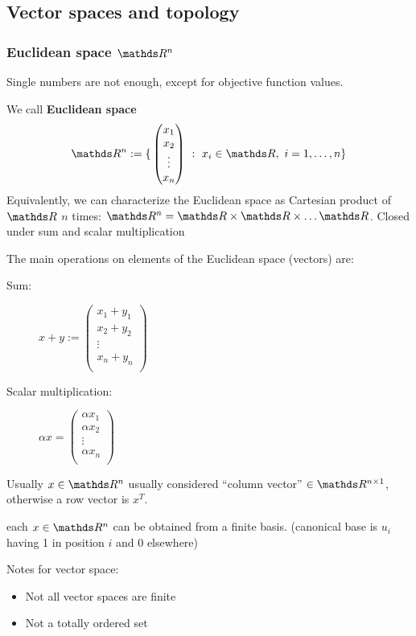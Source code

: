 \documentclass[computationalMathematics.tex]{subfiles}
\begin{document}
\subsection{Vector spaces and topology}
\subsubsection{Euclidean space $\R^n$}
Single numbers are not enough, except for objective function values.
\begin{definition}
We call \textbf{Euclidean space}
\[
  \R^n := \{ \, \begin{pmatrix}x_1\\ x_2\\ \vdots\\ x_n\end{pmatrix}~:~x_i \in \R,~i = 1, \ldots, n\}
\]
Equivalently, we can characterize the Euclidean space as Cartesian product of $\R$ $n$ times: $\R^n = \R \times \R \times \ldots \R$. Closed under sum and scalar multiplication
\end{definition}

The main operations on elements of the Euclidean space (vectors) are:

\begin{description}
  \item[{\sc Sum:}] $x + y := \begin{pmatrix}x_1 + y_1\\
      x_2 + y_2\\
      \vdots\\
      x_n + y_n\\
  \end{pmatrix}$
\item[{\sc Scalar multiplication:}] $\alpha x = \begin{pmatrix}\alpha x_1\\
    \alpha x_2\\
    \vdots\\
    \alpha x_n\\
  \end{pmatrix}$
\end{description}

Usually $x \in \R^n$ usually considered “column vector” $\in \R^{n \times 1}$, otherwise a row vector is  $x^T$.

\begin{definition} each $x \in \R^n$ can be obtained from a finite basis. (canonical base is $u_i$ having 1 in position $i$ and 0 elsewhere)
\end{definition}
Notes for vector space:
\begin{itemize}
    \item Not all vector spaces are finite
    \item Not a totally ordered set
\end{itemize}
\end{document}
